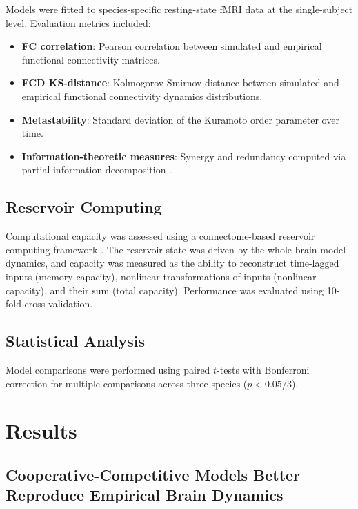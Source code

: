\documentclass[11pt]{article}
\begin{document}
Models were fitted to species-specific resting-state fMRI data at the single-subject level. Evaluation metrics included:
\begin{itemize}
    \item \textbf{FC correlation}: Pearson correlation between simulated and empirical functional connectivity matrices.
    \item \textbf{FCD KS-distance}: Kolmogorov-Smirnov distance between simulated and empirical functional connectivity dynamics distributions.
    \item \textbf{Metastability}: Standard deviation of the Kuramoto order parameter over time.
    \item \textbf{Information-theoretic measures}: Synergy and redundancy computed via partial information decomposition \citep{timme2018synergy}.
\end{itemize}

\subsection{Reservoir Computing}

Computational capacity was assessed using a connectome-based reservoir computing framework \citep{jaeger2004harnessing}. The reservoir state was driven by the whole-brain model dynamics, and capacity was measured as the ability to reconstruct time-lagged inputs (memory capacity), nonlinear transformations of inputs (nonlinear capacity), and their sum (total capacity). Performance was evaluated using 10-fold cross-validation.

\subsection{Statistical Analysis}

Model comparisons were performed using paired $t$-tests with Bonferroni correction for multiple comparisons across three species ($p < 0.05/3$).

\section{Results}

\subsection{Cooperative-Competitive Models Better Reproduce Empirical Brain Dynamics}
\end{document}
